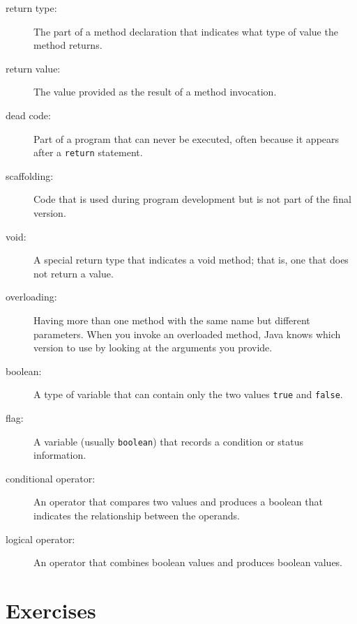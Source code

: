 \documentclass[12pt]{book}
\theoremstyle{exercise}
\begin{document}
\begin{description}

\item[return type:]  The part of a method declaration that indicates
what type of value the method returns.

\item[return value:]  The value provided as the result of a method
invocation.

\item[dead code:]  Part of a program that can never be executed,
often because it appears after a {\tt return} statement.

\item[scaffolding:]  Code that is used during program development
but is not part of the final version.

\item[void:]  A special return type that indicates a void method;
that is, one that does not return a value.

\item[overloading:]  Having more than one method with the same name
but different parameters.  When you invoke an overloaded method,
Java knows which version to use by looking at the arguments you
provide.

\item[boolean:]  A type of variable that can contain only the two
values {\tt true} and {\tt false}.

\item[flag:]  A variable (usually {\tt boolean}) that records
a condition or status information.

\item[conditional operator:]  An operator that compares two values
and produces a boolean that indicates the relationship between the
operands.

\item[logical operator:]  An operator that combines boolean values
and produces boolean values.



\end{description}


\section{Exercises}
\end{document}
